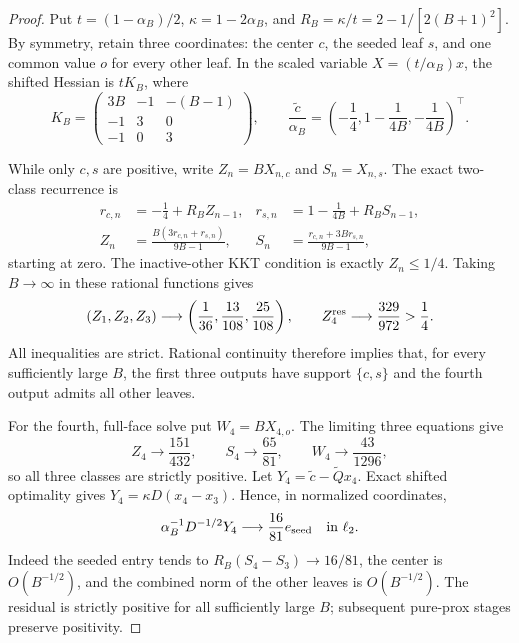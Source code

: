 \documentclass[11pt]{article}
\begin{document}
\begin{proof}
Put $t=(1-\alpha_B)/2$, $\kappa=1-2\alpha_B$, and
$R_B=\kappa/t=2-1/[2(B+1)^2]$.  By symmetry, retain three coordinates:
the center $c$, the seeded leaf $s$, and one common value $o$ for every
other leaf.  In the scaled variable $X=(t/\alpha_B)x$, the shifted Hessian is
$tK_B$, where
\begin{equation}
 K_B=
 \begin{pmatrix}
  3B&-1&-(B-1)\\
  -1&3&0\\
  -1&0&3
 \end{pmatrix},
 \qquad
 \frac{\widetilde c}{\alpha_B}
 =\left(-\frac14,1-\frac{1}{4B},-\frac{1}{4B}\right)^{\!\top}.
 \label{eq:reachable-star-three-class}
\end{equation}

While only $c,s$ are positive, write $Z_n=BX_{n,c}$ and $S_n=X_{n,s}$.
The exact two-class recurrence is
\begin{align}
 r_{c,n}&=-\frac14+R_BZ_{n-1},&
 r_{s,n}&=1-\frac{1}{4B}+R_BS_{n-1},
 \label{eq:reachable-star-rhs}\\
 Z_n&=\frac{B(3r_{c,n}+r_{s,n})}{9B-1},&
 S_n&=\frac{r_{c,n}+3Br_{s,n}}{9B-1},
 \label{eq:reachable-star-restricted-recurrence}
\end{align}
starting at zero.  The inactive-other KKT condition is exactly $Z_n\leq1/4$.
Taking $B\to\infty$ in these rational functions gives
\begin{equation}
 (Z_1,Z_2,Z_3)\longrightarrow
 \left(\frac1{36},\frac{13}{108},\frac{25}{108}\right),
 \qquad
 Z_4^{\rm res}\longrightarrow\frac{329}{972}>\frac14.
 \label{eq:reachable-star-admission-limits}
\end{equation}
All inequalities are strict.  Rational continuity therefore implies that,
for every sufficiently large $B$, the first three outputs have support
$\{c,s\}$ and the fourth output admits all other leaves.

For the fourth, full-face solve put $W_4=BX_{4,o}$.  The limiting three
equations give
\begin{equation}
 Z_4\longrightarrow\frac{151}{432},\qquad
 S_4\longrightarrow\frac{65}{81},\qquad
 W_4\longrightarrow\frac{43}{1296},
 \label{eq:reachable-star-full-state}
\end{equation}
so all three classes are strictly positive.  Let
$Y_4=\widetilde c-\widetilde Qx_4$.  Exact shifted optimality gives
$Y_4=\kappa D(x_4-x_3)$.  Hence, in normalized coordinates,
\begin{equation}
 \alpha_B^{-1}D^{-1/2}Y_4
 \longrightarrow \frac{16}{81}e_{\mathrm{seed}}
 \quad\hbox{in }\ell_2.
 \label{eq:reachable-star-residual-limit}
\end{equation}
Indeed the seeded entry tends to
$R_B(S_4-S_3)\to16/81$, the center is $O(B^{-1/2})$, and the combined norm
of the other leaves is $O(B^{-1/2})$.  The residual is strictly positive for
all sufficiently large $B$; subsequent pure-prox stages preserve positivity.


\end{proof}
\end{document}
